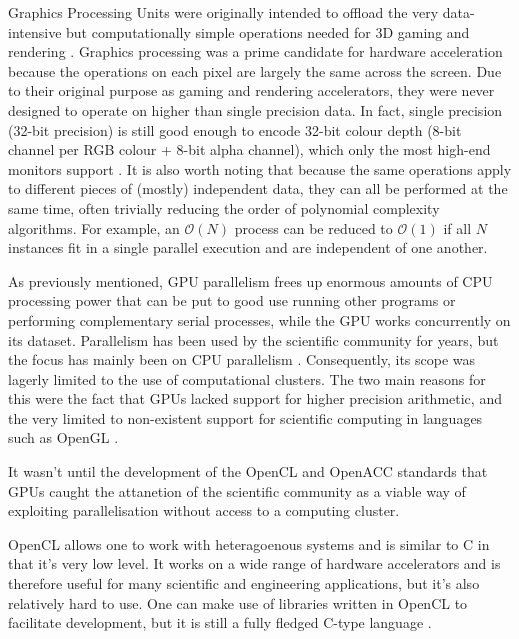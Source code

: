 Graphics Processing Units were originally intended to offload the very data-intensive but computationally simple operations needed for 3D gaming and rendering \cite{gpu1, gpu2, gpu3}. Graphics processing was a prime candidate for hardware acceleration because the operations on each pixel are largely the same across the screen. Due to their original purpose as gaming and rendering accelerators, they were never designed to operate on higher than single precision data. In fact, single precision (32-bit precision) is still good enough to encode 32-bit colour depth (8-bit channel per RGB colour + 8-bit alpha channel), which only the most high-end monitors support \cite{monitor}. It is also worth noting that because the same operations apply to different pieces of (mostly) independent data, they can all be performed at the same time, often trivially reducing the order of polynomial complexity algorithms. For example, an $\mathcal{O}(N)$ process can be reduced to $\mathcal{O}(1)$ if all $N$ instances fit in a single parallel execution and are independent of one another.

As previously mentioned, GPU parallelism frees up enormous amounts of CPU processing power that can be put to good use running other programs or performing complementary serial processes, while the GPU works concurrently on its dataset. Parallelism has been used by the scientific community for years, but the focus has mainly been on CPU parallelism \cite{cpu_par}. Consequently, its scope was lagerly limited to the use of computational clusters. The two main reasons for this were the fact that GPUs lacked support for higher precision arithmetic, and the very limited to non-existent support for scientific computing in languages such as OpenGL \cite{gpu_comp}.

It wasn't until the development of the OpenCL and OpenACC standards that GPUs caught the attanetion of the scientific community as a viable way of exploiting parallelisation without access to a computing cluster.

OpenCL allows one to work with heteragoenous systems and is similar to C in that it's very low level. It works on a wide range of hardware accelerators and is therefore useful for many scientific and engineering applications, but it's also relatively hard to use. One can make use of libraries written in OpenCL to facilitate development, but it is still a fully fledged C-type language \cite{opencl}.


